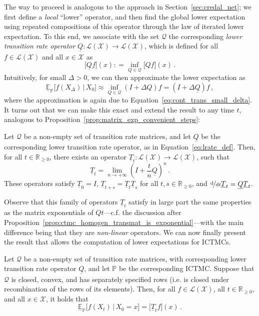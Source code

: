 \documentclass[graybox]{svmult}
\newcommand{\reals}{\mathbb{R}}
\newcommand{\realsnonneg}{\reals_{\geq 0}}
\newcommand{\states}{\mathcal{X}}
\newcommand{\gambles}{\mathcal{L}}
\newcommand{\gamblesX}{\gambles(\states)}
\newcommand{\coloneqq}{:\!=}
\begin{document}
The way to proceed is analogous to the approach in Section~\ref{sec:credal_net}; we first define a \emph{local} ``lower'' operator, and then find the global lower expectation using repeated compositions of this operator through the law of iterated lower expectation. To this end, we associate with the set $\mathcal{Q}$ the corresponding \emph{lower transition rate operator} $\underline{Q}:\gamblesX\to\gamblesX$, which is defined for all $f\in\gamblesX$ and all $x\in\states$ as
\begin{equation}\label{eq:lrate_def}
\bigl[\underline{Q}f\bigr](x) \coloneqq \inf_{Q\in\mathcal{Q}} \bigl[Qf\bigr](x)\,.
\end{equation}
Intuitively, for small $\Delta>0$, we can then approximate the lower expectation as
\begin{equation*}
\underline{\mathbb{E}}_\mathbb{P}\bigl[f(X_\Delta)\,\vert\,X_0\bigr] \approx \inf_{Q\in\mathcal{Q}} (I+\Delta Q)f = (I+\Delta\underline{Q})f\,,
\end{equation*}
where the approximation is again due to Equation~\eqref{eq:cont_trans_small_delta}. It turns out that we can make this exact and extend the result to any time $t$, analogous to Proposition~\ref{prop:matrix_exp_convenient_steps}:
\begin{theorem}\label{theo:continuous_trans_is_imprecise_exponential}
Let $\mathcal{Q}$ be a non-empty set of transition rate matrices, and let $\underline{Q}$ be the corresponding lower transition rate operator, as in Equation~\eqref{eq:lrate_def}. Then, for all $t\in\realsnonneg$, there exists an operator $\underline{T}_t:\gamblesX\to\gamblesX$, such that
\begin{equation*}
\underline{T}_t = \lim_{n\to+\infty}\left(I+\frac{t}{n}\underline{Q}\right)^n\,.
\end{equation*}
These operators satisfy $\underline{T}_0=I$, $\underline{T}_{t+s}=\underline{T}_t\underline{T}_s$ for all $t,s\in\realsnonneg$, and $\nicefrac{\mathrm{d}}{\mathrm{d}t}\underline{T}_t=\underline{Q}\underline{T}_t$. 
\end{theorem}
Observe that this family of operators $\underline{T}_t$ satisfy in large part the same properties as the matrix exponentials of $Qt$---c.f. the discussion after Proposition~\ref{prop:ctmc_homogen_transmat_is_exponential}---with the main difference being that they are \emph{non-linear} operators. We can now finally present the result that allows the computation of lower expectations for ICTMCs.
\begin{theorem}\label{theo:lower_exp_is_lower_trans_ctmc}
Let $\mathcal{Q}$ be a non-empty set of transition rate matrices, with corresponding lower transition rate operator $\underline{Q}$, and let $\mathbb{P}$ be the corresponding ICTMC. Suppose that $\mathcal{Q}$ is closed, convex, and has separately specified rows (i.e. is closed under recombination of the rows of its elements). Then, for all $f\in\gamblesX$, all $t\in\realsnonneg$, and all $x\in\states$, it holds that
\begin{equation}\label{eq:lower_exp_is_lower_trans_ctmc}
\underline{\mathbb{E}}_\mathbb{P}\bigl[f(X_t)\,\vert\,X_0=x\bigr] = \bigl[\underline{T}_tf\bigr](x)\,.
\end{equation}
\end{theorem}
\end{document}
